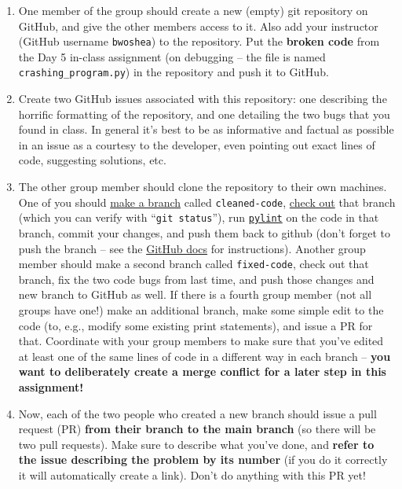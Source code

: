 \documentclass[10pt]{article}
\begin{document}
\begin{enumerate}

\item One member of the group should create a new (empty) git
repository on GitHub, and give the other members access to it.  Also
add your instructor (GitHub username \texttt{bwoshea}) to the
repository. Put the \textbf{broken code} from the Day 5 in-class
assignment (on debugging -- the file is named
\texttt{crashing\_program.py}) in the repository and push it to
GitHub.

\item Create two GitHub issues associated with this repository: one
describing the horrific formatting of the repository, and one
detailing the two bugs that you found in class.  In general it's best
to be as informative and factual as possible in an issue as a courtesy
to the developer, even pointing out exact lines of code, suggesting
solutions, etc.

  \item The other group member should clone the repository to their
  own machines.  One of you should \href{https://git-scm.com/book/en/v2/Git-Branching-Basic-Branching-and-Merging}{make a branch} called
  \texttt{cleaned-code}, \href{https://git-scm.com/docs/git-checkout}{check out} that branch (which you can
  verify with ``\texttt{git status}''), run \href{https://www.pylint.org/}{\texttt{pylint}} on the code in that
  branch, commit your changes, and push them back to github (don't
  forget to push the branch -- see the
  \href{https://github.com/git-guides/git-push}{GitHub docs} for instructions).  Another
  group member should make a second branch called \texttt{fixed-code},
  check out that branch,
  fix the two code bugs from last time, and push those changes and new
  branch to
  GitHub as well.  If there is a fourth group member (not all groups
  have one!) make an additional branch, make some simple edit to the
  code (to, e.g., modify some existing print statements), and issue a
  PR for that.
  Coordinate with your group members to make sure that you've edited
  at least one of the same lines of code in a different way in each
  branch -- \textbf{you want to deliberately create a merge conflict
    for a later step in this assignment!}

\item Now, each of the two people who created a new branch should
  issue a pull request (PR) \textbf{from their branch to the main branch}
  (so there will be two pull requests).  Make sure to describe what
  you've done, and \textbf{refer to the issue describing the problem
    by its number} (if you do it correctly it will automatically
  create a link). Don't do anything with this PR 
  yet!


\end{enumerate}
\end{document}

